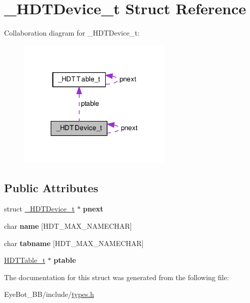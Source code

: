 \hypertarget{struct___h_d_t_device__t}{\section{\-\_\-\-H\-D\-T\-Device\-\_\-t \-Struct \-Reference}
\label{struct___h_d_t_device__t}
}


\-Collaboration diagram for \-\_\-\-H\-D\-T\-Device\-\_\-t\-:\nopagebreak
\begin{figure}[H]
\begin{center}
\leavevmode
\includegraphics[width=208pt]{struct___h_d_t_device__t__coll__graph}
\end{center}
\end{figure}
\subsection*{\-Public \-Attributes}
\begin{DoxyCompactItemize}
\item 
\hypertarget{struct___h_d_t_device__t_aef4456f84278a5c4718b861ea3bae74c}{struct \hyperlink{struct___h_d_t_device__t}{\-\_\-\-H\-D\-T\-Device\-\_\-t} $\ast$ {\bfseries pnext}}\label{struct___h_d_t_device__t_aef4456f84278a5c4718b861ea3bae74c}

\item 
\hypertarget{struct___h_d_t_device__t_adffe25e25f9c3a6e7007c1b8cc6b5e36}{char {\bfseries name} \mbox{[}\-H\-D\-T\-\_\-\-M\-A\-X\-\_\-\-N\-A\-M\-E\-C\-H\-A\-R\mbox{]}}\label{struct___h_d_t_device__t_adffe25e25f9c3a6e7007c1b8cc6b5e36}

\item 
\hypertarget{struct___h_d_t_device__t_a17da3552d98775840c1781f83ed7c2d1}{char {\bfseries tabname} \mbox{[}\-H\-D\-T\-\_\-\-M\-A\-X\-\_\-\-N\-A\-M\-E\-C\-H\-A\-R\mbox{]}}\label{struct___h_d_t_device__t_a17da3552d98775840c1781f83ed7c2d1}

\item 
\hypertarget{struct___h_d_t_device__t_afc24e8dc5c7e41992d0a709220ed975e}{\hyperlink{struct___h_d_t_table__t}{\-H\-D\-T\-Table\-\_\-t} $\ast$ {\bfseries ptable}}\label{struct___h_d_t_device__t_afc24e8dc5c7e41992d0a709220ed975e}

\end{DoxyCompactItemize}


\-The documentation for this struct was generated from the following file\-:\begin{DoxyCompactItemize}
\item 
\-Eye\-Bot\-\_\-\-B\-B/include/\hyperlink{types_8h}{types.\-h}\end{DoxyCompactItemize}
